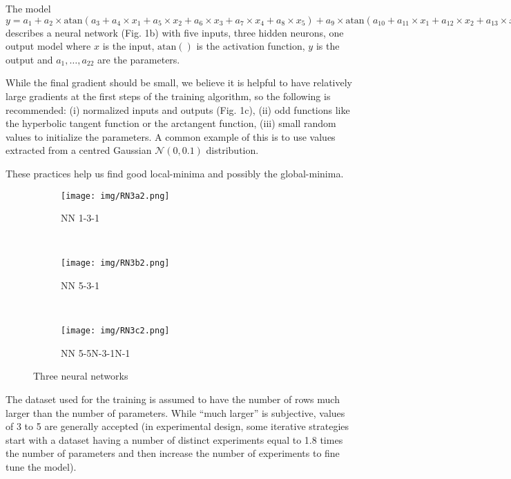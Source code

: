 The model
\(y = a_1 + a_2\times \text{atan}(a_3 + a_4\times x_1 + a_5\times x_2 + a_6\times x_3 + a_7\times x_4 + a_8\times x_5) + a_9\times \text{atan}(a_{10} + a_{11}\times x_1 + a_{12}\times x_2 + a_{13}\times x_3 + a_{14}\times x_4 + a_{15}\times x_5) + a_{16}\text{atan}(a_{17} + a_{18}\times x_1 + a_{19}\times x_2 + a_{20}\times x_3 + a_{21}\times x_4 + a_{22}\times x_5)\)
describes a neural network (Fig. 1b) with five inputs, three hidden
neurons, one output model where \(x\) is the input, \(\text{atan}()\) is
the activation function, \(y\) is the output and \(a_1,\dots,a_{22}\)
are the parameters.

While the final gradient should be small, we believe it is helpful to
have relatively large gradients at the first steps of the training
algorithm, so the following is recommended: (i) normalized inputs and
outputs (Fig. 1c), (ii) odd functions like the hyperbolic tangent
function or the arctangent function, (iii) small random values to
initialize the parameters. A common example of this is to use values
extracted from a centred Gaussian \(\mathcal N(0, 0.1)\) distribution.

These practices help us find good local-minima and possibly the
global-minima.

\begin{figure}
    \centering
    \begin{subfigure}[b]{0.242\textwidth}
        \texttt{[image: img/RN3a2.png]}
        \caption{NN 1-3-1}
        \label{fig:N131}
    \end{subfigure}
    ~ 
    \begin{subfigure}[b]{0.250\textwidth}
        \texttt{[image: img/RN3b2.png]}
        \caption{NN 5-3-1}
        \label{fig:N531}
    \end{subfigure}
    ~ 
    \begin{subfigure}[b]{0.396\textwidth}
        \texttt{[image: img/RN3c2.png]}
        \caption{NN 5-5N-3-1N-1}
        \label{fig:N55311}
    \end{subfigure}
    \caption{Three neural networks}
\end{figure}

The dataset used for the training is assumed to have the number of rows
much larger than the number of parameters. While ``much larger'' is
subjective, values of 3 to 5 are generally accepted (in experimental
design, some iterative strategies start with a dataset having a number
of distinct experiments equal to 1.8 times the number of parameters and
then increase the number of experiments to fine tune the model).

